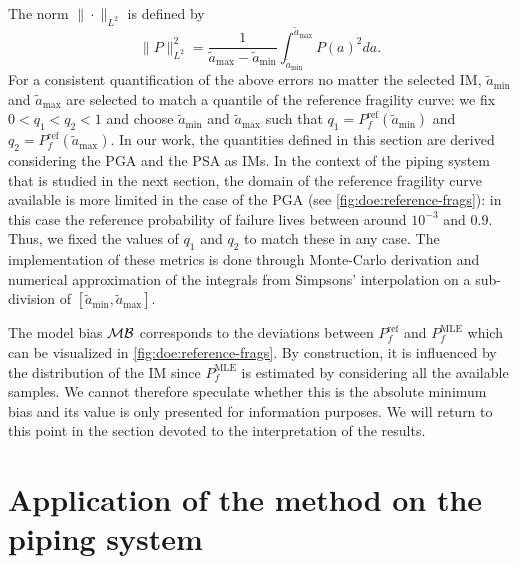 The norm $\|\cdot\|_{L^2}$ is defined by 
    \begin{equation}
        \|P\|_{L^2}^2 = \frac{1}{\tilde a_{\max}-\tilde a_{\min}}\int_{\tilde a_{\min}}^{\tilde a_{\max}}P(a)^2da. 
    \end{equation}
For a consistent quantification of the above errors no matter the selected IM, $\tilde a_{\min}$ and $\tilde a_{\max}$ are selected to match a quantile of the reference fragility curve:
we fix $0<q_1<q_2<1$ and choose $\tilde a_{\min}$ and $\tilde a_{\max}$ such that $q_1=P^{\text{ref}}_f(\tilde a_{\min})$ and $q_2=P^{\text{ref}}_f(\tilde a_{\max})$. In our work, the quantities defined in this section are derived considering the PGA and the PSA as IMs.
In the context of the piping system that is studied in the next section, 
the domain of the reference fragility curve available is more limited in the case of the PGA (see \cref{fig:doe:reference-frags}): in this case the reference probability of failure lives between around $10^{-3} $ and $0.9$.
Thus, we fixed the values of $q_1$ and $q_2$ to match these in any case. The implementation of these metrics is done through Monte-Carlo derivation and numerical approximation of the integrals from Simpsons' interpolation on a sub-division of $[\tilde a_{\min},\tilde a_{\text{max}}]$.

{The model bias $\mathcal{M}\mathcal{B}$ corresponds to the deviations between $P_f^{\text{ref}}$ and $P_f^{\text{MLE}}$ which can be visualized in \cref{fig:doe:reference-frags}. By construction, it is influenced by the distribution of the IM since $P_f^{\text{MLE}}$ is estimated by considering all the available samples. We cannot therefore speculate whether this is the absolute minimum bias and its value is only presented for information purposes. We will return to this point in the section devoted to the interpretation of the results.}






\section{Application of the method on the piping system}\label{sec:doe:application}


